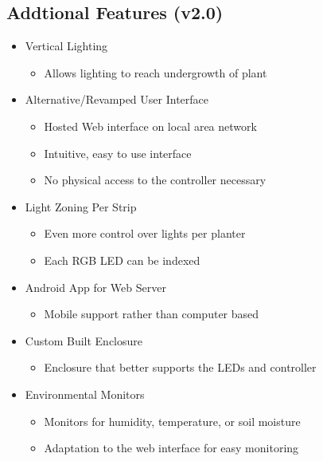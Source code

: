 \documentclass[letterpaper,10pt,draftclsnofoot,onecolumn]{article}
\begin{document}
	\subsection*{Addtional Features (v2.0)}
	\begin{itemize}

		\item Vertical Lighting
		\begin{itemize}
			\item Allows lighting to reach undergrowth of plant
		\end{itemize}

		\item Alternative/Revamped User Interface
		\begin{itemize}
			\item Hosted Web interface on local area network
			\item Intuitive, easy to use interface
			\item No physical access to the controller necessary
		\end{itemize}

		\item Light Zoning Per Strip
		\begin{itemize}
			\item Even more control over lights per planter
			\item Each RGB LED can be indexed
		\end{itemize}

		\item Android App for Web Server
		\begin{itemize}
			\item Mobile support rather than computer based
		\end{itemize}

		\item Custom Built Enclosure
		\begin{itemize}
			\item Enclosure that better supports the LEDs and controller
		\end{itemize}

		\item Environmental Monitors
		\begin{itemize}
			\item Monitors for humidity, temperature, or soil moisture
			\item Adaptation to the web interface for easy monitoring
		\end{itemize}

	\end{itemize}
\end{document}
